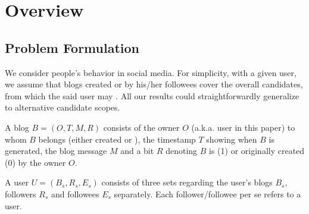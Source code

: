 \section{\sys{} Overview}
\label{sec:overv}


\subsection{Problem Formulation}

We consider people's \retg{} behavior in social media.
For simplicity, with a given user, we assume that blogs created or \retd{} by his/her followees cover the overall candidates, from which the said user may \ret{}.
All our results could straightforwardly generalize to alternative candidate scopes.

\begin{definition}
\label{def:blog}
A blog $B = (O, T, M, R)$ consists of the owner $O$ (a.k.a. user in this paper) to whom $B$ belongs (either created or \retd{}), the timestamp $T$ showing when $B$ is generated, the blog message $M$ and a bit $R$ denoting $B$ is \retd{} (1) or originally created (0) by the owner $O$.
\end{definition}

\begin{definition}
\label{def:user}
A user $U = (B_s, R_s, E_s)$ consists of three sets regarding the user's blogs $B_s$, followers $R_s$ and followees $E_s$ separately.
Each follower/followee per se refers to a user.
\end{definition}

